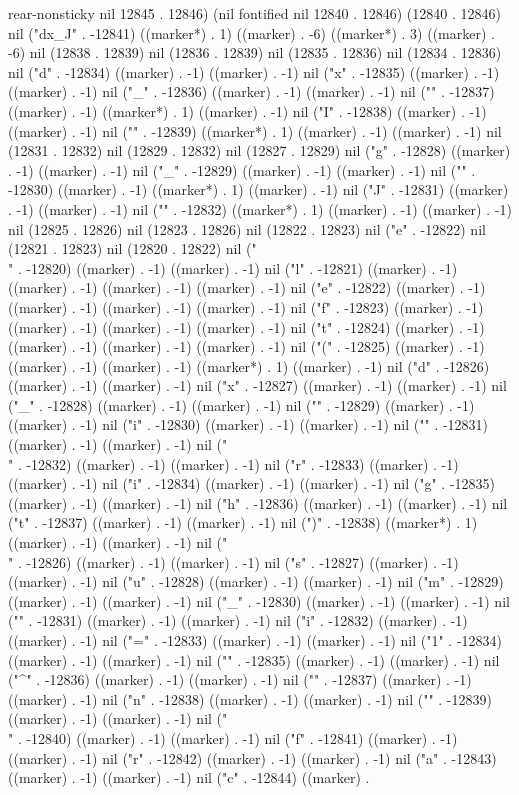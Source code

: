 rear-nonsticky nil 12845 . 12846) (nil fontified nil 12840 . 12846) (12840 . 12846) nil ("dx_{J}" . -12841) ((marker*) . 1) ((marker) . -6) ((marker*) . 3) ((marker) . -6) nil (12838 . 12839) nil (12836 . 12839) nil (12835 . 12836) nil (12834 . 12836) nil ("d" . -12834) ((marker) . -1) ((marker) . -1) nil ("x" . -12835) ((marker) . -1) ((marker) . -1) nil ("_" . -12836) ((marker) . -1) ((marker) . -1) nil ("{" . -12837) ((marker) . -1) ((marker*) . 1) ((marker) . -1) nil ("I" . -12838) ((marker) . -1) ((marker) . -1) nil ("}" . -12839) ((marker*) . 1) ((marker) . -1) ((marker) . -1) nil (12831 . 12832) nil (12829 . 12832) nil (12827 . 12829) nil ("g" . -12828) ((marker) . -1) ((marker) . -1) nil ("_" . -12829) ((marker) . -1) ((marker) . -1) nil ("{" . -12830) ((marker) . -1) ((marker*) . 1) ((marker) . -1) nil ("J" . -12831) ((marker) . -1) ((marker) . -1) nil ("}" . -12832) ((marker*) . 1) ((marker) . -1) ((marker) . -1) nil (12825 . 12826) nil (12823 . 12826) nil (12822 . 12823) nil ("e" . -12822) nil (12821 . 12823) nil (12820 . 12822) nil ("\\" . -12820) ((marker) . -1) ((marker) . -1) nil ("l" . -12821) ((marker) . -1) ((marker) . -1) ((marker) . -1) ((marker) . -1) nil ("e" . -12822) ((marker) . -1) ((marker) . -1) ((marker) . -1) ((marker) . -1) nil ("f" . -12823) ((marker) . -1) ((marker) . -1) ((marker) . -1) ((marker) . -1) nil ("t" . -12824) ((marker) . -1) ((marker) . -1) ((marker) . -1) ((marker) . -1) nil ("(" . -12825) ((marker) . -1) ((marker) . -1) ((marker) . -1) ((marker*) . 1) ((marker) . -1) nil ("d" . -12826) ((marker) . -1) ((marker) . -1) nil ("x" . -12827) ((marker) . -1) ((marker) . -1) nil ("_" . -12828) ((marker) . -1) ((marker) . -1) nil ("{" . -12829) ((marker) . -1) ((marker) . -1) nil ("i" . -12830) ((marker) . -1) ((marker) . -1) nil ("}" . -12831) ((marker) . -1) ((marker) . -1) nil ("\\" . -12832) ((marker) . -1) ((marker) . -1) nil ("r" . -12833) ((marker) . -1) ((marker) . -1) nil ("i" . -12834) ((marker) . -1) ((marker) . -1) nil ("g" . -12835) ((marker) . -1) ((marker) . -1) nil ("h" . -12836) ((marker) . -1) ((marker) . -1) nil ("t" . -12837) ((marker) . -1) ((marker) . -1) nil (")" . -12838) ((marker*) . 1) ((marker) . -1) ((marker) . -1) nil ("\\" . -12826) ((marker) . -1) ((marker) . -1) nil ("s" . -12827) ((marker) . -1) ((marker) . -1) nil ("u" . -12828) ((marker) . -1) ((marker) . -1) nil ("m" . -12829) ((marker) . -1) ((marker) . -1) nil ("_" . -12830) ((marker) . -1) ((marker) . -1) nil ("{" . -12831) ((marker) . -1) ((marker) . -1) nil ("i" . -12832) ((marker) . -1) ((marker) . -1) nil ("=" . -12833) ((marker) . -1) ((marker) . -1) nil ("1" . -12834) ((marker) . -1) ((marker) . -1) nil ("}" . -12835) ((marker) . -1) ((marker) . -1) nil ("^" . -12836) ((marker) . -1) ((marker) . -1) nil ("{" . -12837) ((marker) . -1) ((marker) . -1) nil ("n" . -12838) ((marker) . -1) ((marker) . -1) nil ("}" . -12839) ((marker) . -1) ((marker) . -1) nil ("\\" . -12840) ((marker) . -1) ((marker) . -1) nil ("f" . -12841) ((marker) . -1) ((marker) . -1) nil ("r" . -12842) ((marker) . -1) ((marker) . -1) nil ("a" . -12843) ((marker) . -1) ((marker) . -1) nil ("c" . -12844) ((marker) . 